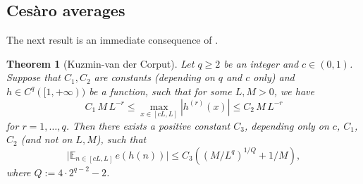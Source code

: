 \documentclass[11pt]{amsart}
\newtheorem{theorem}[lemma]{Theorem}
\theoremstyle{definition}
\newcommand{\E}{{\mathbb E}}
\newcommand{\N}{{\mathbb N}}
\begin{document}
 	\subsection{Ces\`aro averages} The next result is an immediate consequence of  \cite[Theorem~2.9]{GK91}. 	
 	
 	 \begin{theorem}[Kuzmin-van der Corput]\label{T:VDC}
 		Let $q\geq 2$ be an integer and $c\in (0,1)$. Suppose that $C_1,C_2$ are constants  (depending  on $q$ and $c$ only)  and  $h\in C^{q}([1,+\infty))$ be a function, such that for some   $L,M>0$, we have
 		$$
 		C_1 \, M \, L^{-r}\leq \max_{x\in [cL,L]} |h^{(r)}(x)| \leq C_2 \, M \, L^{-r}
 		$$
 		for $r=1,\ldots, q$. Then there exists a positive constant $C_3$, depending only on $c$, $C_1$, $C_2$ (and not on $L,M$),
 		such that %
 		$$
 		\big|\E_{n\in  [cL,L]} \, e(h(n))\big|\leq C_3((M /L^{q})^{1/Q}+1/M),
 		$$
 		where $Q:=4\cdot 2^{q-2}-2$.	 	
 	\end{theorem}
 	
\end{document}
